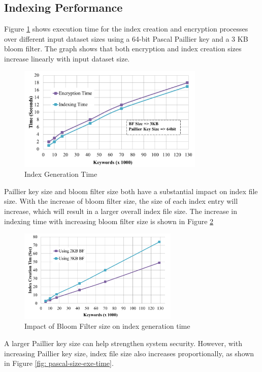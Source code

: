 \subsection{Indexing Performance}
Figure \ref{fig:Index-Generation-Time} shows execution time for the index creation
and encryption 
processes over different input dataset sizes 
using a 64-bit Pascal Paillier key and a 3 KB bloom filter. The graph shows that
both encryption and index creation sizes increase linearly with input dataset size.

\begin{figure}[h!]
  \centering
  \includegraphics[width=3.5in]{figures/indexing_encryption_time.png}
  \caption{Index Generation Time}
  \label{fig:Index-Generation-Time}
\end{figure}

Paillier key size and bloom filter size both have a substantial impact on index file size. 
With the increase of bloom filter size, the size of each
index entry will increase, which will result in a larger overall index file
size. The increase in indexing time with increasing bloom filter size 
is shown in Figure \ref{fig: bf-size-exe-time}

 \begin{figure}
  \centering
  \includegraphics[width= 3in]{figures/index_time_graph.png}
  \caption{Impact of Bloom Filter size on index generation time}
  \label{fig: bf-size-exe-time}
\end{figure}

A larger Paillier key size can help strengthen system security. However, with
increasing Paillier key size, index file size also increases proportionally,
as shown in
Figure \ref{fig: pascal-size-exe-time}.

